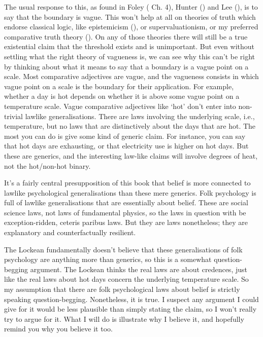 \documentclass[
  12pt,
  letterpaper,
]{scrbook}
\begin{document}
The usual response to this, as found in Foley
( Ch. 4), Hunter
() and Lee
(), is to say that the boundary is vague.
This won't help at all on theories of truth which endorse classical
logic, like epistemicism (), or supervaluationism, or my preferred comparative truth theory
(). On any of those
theories there will still be a true existential claim that the threshold
exists and is unimportant. But even without settling what the right
theory of vagueness is, we can see why this can't be right by thinking
about what it means to say that a boundary is a vague point on a scale.
Most comparative adjectives are vague, and the vagueness consists in
which vague point on a scale is the boundary for their application. For
example, whether a day is hot depends on whether it is above some vague
point on a temperature scale. Vague comparative adjectives like `hot'
don't enter into non-trivial lawlike generalisations. There are laws
involving the underlying scale, i.e., temperature, but no laws that are
distinctively about the days that are hot. The most you can do is give
some kind of generic claim. For instance, you can say that hot days are
exhausting, or that electricity use is higher on hot days. But these are
generics, and the interesting law-like claims will involve degrees of
heat, not the hot/non-hot binary.

It's a fairly central presupposition of this book that belief is more
connected to lawlike psychological generalisations than these mere
generics. Folk psychology is full of lawlike generalisations that are
essentially about belief. These are social science laws, not laws of
fundamental physics, so the laws in question with be exception-ridden,
ceteris paribus laws. But they are laws nonetheless; they are
explanatory and counterfactually resilient.

The Lockean fundamentally doesn't believe that these generalisations of
folk psychology are anything more than generics, so this is a somewhat
question-begging argument. The Lockean thinks the real laws are about
credences, just like the real laws about hot days concern the underlying
temperature scale. So my assumption that there are folk psychological
laws about belief is strictly speaking question-begging. Nonetheless, it
is true. I suspect any argument I could give for it would be less
plausible than simply stating the claim, so I won't really try to argue
for it. What I will do is illustrate why I believe it, and hopefully
remind you why you believe it too.
\end{document}
